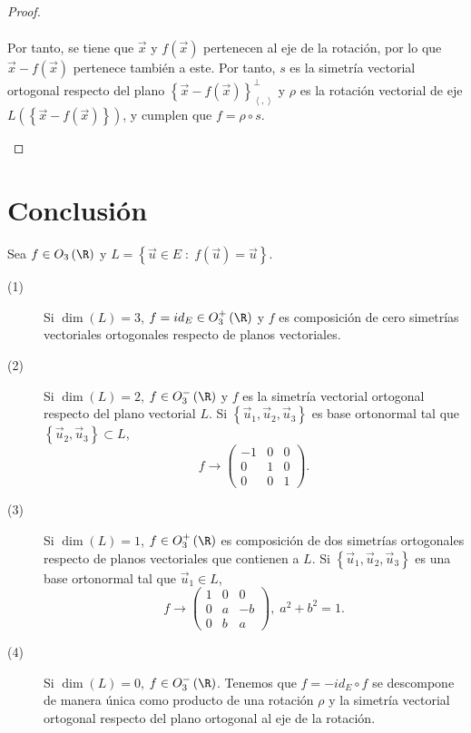 \begin{description}
\begin{proof}
\begin{description}
\[\begin{split}
\end{split}
\]
Por tanto, se tiene que $\displaystyle \vec{x} $ y $\displaystyle f\left(\vec{x}\right) $ pertenecen al eje de la rotación, por lo que $\displaystyle \vec{x} -f\left(\vec{x}\right) $ pertenece también a este. Por tanto, $\displaystyle s $ es la simetría vectorial ortogonal respecto del plano $\displaystyle \left\{ \vec{x}-f\left(\vec{x}\right)\right\} ^{\perp }_{\left\langle ,  \right\rangle } $ y $\displaystyle \rho $ es la rotación vectorial de eje $\displaystyle L\left( \left\{ \vec{x}-f\left(\vec{x}\right) \right\} \right)$, y cumplen que $\displaystyle f = \rho \circ s  $.
	\end{description}
\end{proof}
\end{description}
\section*{Conclusión}
Sea $\displaystyle f \in O_{3}\left(\R\right) $ y $\displaystyle L = \left\{ \vec{u}\in E \; : \; f\left(\vec{u}\right) = \vec{u}\right\}  $.
\begin{description}
\item[(1)] Si $\displaystyle \dim\left(L\right) = 3 $, $\displaystyle f = id _{E} \in O^{+}_{3}\left(\R\right) $ y $\displaystyle f $ es composición de cero simetrías vectoriales ortogonales respecto de planos vectoriales.
\item[(2)] Si $\displaystyle \dim\left(L\right) = 2 $, $\displaystyle f \in O_{3}^{-}\left(\R\right) $ y $\displaystyle f $ es la simetría vectorial ortogonal respecto del plano vectorial $\displaystyle L $. Si $\displaystyle \left\{ \vec{u}_{1}, \vec{u}_{2}, \vec{u}_{3}\right\}  $ es base ortonormal tal que $\displaystyle \left\{ \vec{u}_{2}, \vec{u}_{3}\right\}\subset L $,
	\[f \to \begin{pmatrix} -1 & 0 & 0 \\
	0 & 1 & 0 \\
0 & 0 & 1\end{pmatrix} .\]
\item[(3)] Si $\displaystyle \dim\left(L\right) = 1 $, $\displaystyle f \in O^{+}_{3}\left(\R\right) $ es composición de dos simetrías ortogonales respecto de planos vectoriales que contienen a $\displaystyle L $. Si $\displaystyle \left\{ \vec{u}_{1}, \vec{u}_{2}, \vec{u}_{3}\right\}  $ es una base ortonormal tal que $\displaystyle \vec{u}_{1} \in L $,
		\[f \to \begin{pmatrix} 1 & 0 & 0 \\
		0 & a & - b \\
	0 & b & a\end{pmatrix}, \; a^{2} + b^{2} = 1 .\]
\item[(4)] Si $\displaystyle \dim\left(L\right)= 0 $, $\displaystyle f \in O^{-}_{3}\left(\R\right) $. Tenemos que $\displaystyle f = - id _{E} \circ f $ se descompone de manera única como producto de una rotación $\displaystyle \rho $ y la simetría vectorial ortogonal respecto del plano ortogonal al eje de la rotación. 
\end{description}
